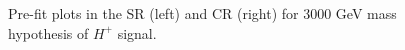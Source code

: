 \begin{figure}[H]
  \centering
  \caption{Pre-fit plots in the SR (left) and CR (right) for 3000 GeV mass hypothesis of $H^{+}$ signal.}
  \label{fig:Prefit_Hp3000_Asimov}
\end{figure}

